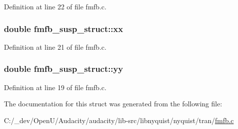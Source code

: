 Definition at line 22 of file fmfb.\+c.

\subsubsection[{\texorpdfstring{xx}{xx}}]{\setlength{\rightskip}{0pt plus 5cm}double fmfb\+\_\+susp\+\_\+struct\+::xx}\hypertarget{structfmfb__susp__struct_a7cf7919fb44b052c3b25ac12906da568}{}\label{structfmfb__susp__struct_a7cf7919fb44b052c3b25ac12906da568}


Definition at line 21 of file fmfb.\+c.

\subsubsection[{\texorpdfstring{yy}{yy}}]{\setlength{\rightskip}{0pt plus 5cm}double fmfb\+\_\+susp\+\_\+struct\+::yy}\hypertarget{structfmfb__susp__struct_a61011b949ed764b15134d4f5853758e3}{}\label{structfmfb__susp__struct_a61011b949ed764b15134d4f5853758e3}


Definition at line 19 of file fmfb.\+c.



The documentation for this struct was generated from the following file\+:\begin{DoxyCompactItemize}
\item 
C\+:/\+\_\+dev/\+Open\+U/\+Audacity/audacity/lib-\/src/libnyquist/nyquist/tran/\hyperlink{fmfb_8c}{fmfb.\+c}\end{DoxyCompactItemize}
